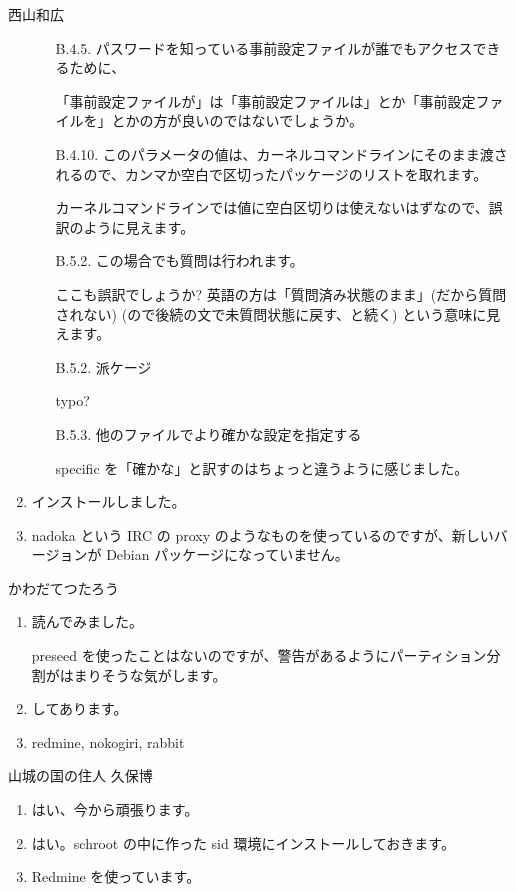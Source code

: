 \documentclass[mingoth,a4paper]{jsarticle}
\begin{document}
\begin{prework}{ 西山和広 }
\begin{enumerate}
\begin{itemize}
    \item[B.4.5.]
    パスワードを知っている事前設定ファイルが誰でもアクセスできるために、
   
    「事前設定ファイルが」は「事前設定ファイルは」とか「事前設定ファイルを」とかの方が良いのではないでしょうか。

    \item[B.4.10.]
    このパラメータの値は、カーネルコマンドラインにそのまま渡されるので、カンマか空白で区切ったパッケージのリストを取れます。
   
    カーネルコマンドラインでは値に空白区切りは使えないはずなので、誤訳のように見えます。

    \item[B.5.2.]
    この場合でも質問は行われます。
   
    ここも誤訳でしょうか? 英語の方は「質問済み状態のまま」(だから質問されない) (ので後続の文で未質問状態に戻す、と続く) という意味に見えます。

    \item[B.5.2.]
    派ケージ
   
    typo?

    \item[B.5.3.]
    他のファイルでより確かな設定を指定する
   
    specific を「確かな」と訳すのはちょっと違うように感じました。

  \end{itemize}

  \item インストールしました。
  \item nadoka という IRC の proxy のようなものを使っているのですが、新しいバージョンが Debian パッケージになっていません。
  \end{enumerate}
\end{prework}

\begin{prework}{ かわだてつたろう }
  \begin{enumerate}
  \item 読んでみました。

    preseed を使ったことはないのですが、警告があるようにパーティション分割がはまりそうな気がします。
  \item してあります。
  \item redmine, nokogiri, rabbit
  \end{enumerate}
\end{prework}

\begin{prework}{ 山城の国の住人 久保博 }
  \begin{enumerate}
  \item はい、今から頑張ります。
  \item はい。schroot の中に作った sid 環境にインストールしておきます。
  \item Redmine を使っています。
  \end{enumerate}
\end{prework}
\end{document}
